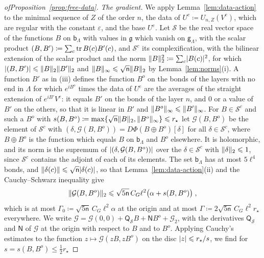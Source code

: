 \documentclass[11pt]{preprint}
\DeclarePairedDelimiter{\abs}{\lvert}{\rvert}
\DeclarePairedDelimiter{\norm}{\lVert}{\rVert}
\numberwithin{equation}{section}
\begin{document}
\begin{proof}[ofProposition~\ref{prop:free-data}]
\emph{The gradient.} We apply Lemma~\ref{lem:data-action} to the minimal sequence of $Z$ of the order $n$, the data of $U^e \coloneqq U_{n,Z}(V^e)$, which are regular with the constant $\varepsilon$, and the base $U^e$. Let $\mathcal S$ be the real vector space of the functions $B$ on $\mathsf b_\Lambda$ with values in $\mathfrak g$ which vanish on $\mathsf g_\Lambda$, with the scalar product $(B, B') \coloneqq \sum_c\operatorname{tr} B(c)B'(c)$, and $\mathcal S^c$ its complexification, with the bilinear extension of the scalar product and the norm $\norm B_2^2 \coloneqq \sum_c\abs{B(c)}^2$, for which $\abs{(B, B')} \leqslant \norm B_2\norm{B'}_2$ and $\norm B_\infty \leqslant \sqrt{\mathsf n}\norm B_2$ by Lemma~\ref{lem:norms}(i). A function $B'$ as in (iii) defines the function $B^o$ on the bonds of the layers with no end in $\Lambda$ for which $e^{iB^o}$ times the data of $U^e$ are the averages of the straight extension of $e^{iB'}V^e$: it equals $B'$ on the bonds of the layer $n$, and $0$ or a value of $B'$ on the others, so that it is linear in $B'$ and $\norm{B^o}_\infty \leqslant \norm{B'}_\infty$. For $B \in \mathcal S^c$ and such a $B^o$ with $s(B, B^o) \coloneqq \max\{ \sqrt{\mathsf n}\norm B_2, \norm{B^o}_\infty \} \leqslant r_\star$ let $\mathcal G(B, B^o)$ be the element of $\mathcal S^c$ with $(\delta, \mathcal G(B, B^o)) = D\Phi(B \oplus B^o)[\delta]$ for all $\delta \in \mathcal S^c$, where $B \oplus B^o$ is the function which equals $B$ on $\mathsf b_\Lambda$ and $B^o$ elsewhere. It is holomorphic, and its norm is the supremum of $\abs{(\delta, \mathcal G(B, B^o))}$ over the $\delta \in \mathcal S^c$ with $\norm\delta_2 \leqslant 1$, since $\mathcal S^c$ contains the adjoint of each of its elements. The set $\mathsf b_\Lambda$ has at most $5\ell^4$ bonds, and $\norm{\delta(c)} \leqslant \sqrt{\mathsf n}\abs{\delta(c)}$, so that Lemma~\ref{lem:data-action}(ii) and the Cauchy--Schwarz inequality give
\begin{equation}\label{eq:free-gradient}
    \norm{\mathcal G(B, B^o)}_2 \leqslant \sqrt{5\mathsf n}\,C_G\ell^2\bigl(\alpha + s(B, B^o)\bigr)\;,
\end{equation}
which is at most $\Gamma_0 \coloneqq \sqrt{5\mathsf n}\,C_G\ell^2\alpha$ at the origin and at most $\Gamma \coloneqq 2\sqrt{5\mathsf n}\,C_G\ell^2r_\star$ everywhere. We write $\mathcal G = \mathcal G(0, 0) + \mathsf Q_{\mathcal S}B + \mathsf NB^o + \mathcal G_2$, with the derivatives $\mathsf Q_{\mathcal S}$ and $\mathsf N$ of $\mathcal G$ at the origin with respect to $B$ and to $B^o$. Applying Cauchy's estimates to the function $z \mapsto \mathcal G(zB, zB^o)$ on the disc $\abs z \leqslant r_\star/s$, we find for $s = s(B, B^o) \leqslant \frac{1}{2}r_\star$

\end{proof}
\end{document}

